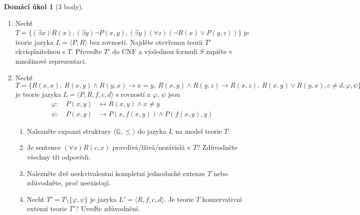 \documentclass[a4paper]{article}
\theoremstyle{definition}
\newtheorem*{ukol}{Domácí úkol}
\begin{document}
\medskip\begin{ukol}[3 body] {\,}
\begin{enumerate}[label=\arabic*.]
\item Nechť $T=\{(\exists x)R(x), (\exists y)\neg P(x,y), (\exists y)(\forall z)(\neg R(x)\vee P(y,z))\}$ je teorie jazyka $L=\langle P,R\rangle$ bez rovnosti. Najděte otevřenou teorii $T'$ ekvisplnitelnou s $T$. Převeďte $T'$ do CNF a výslednou formuli $S$ zapište v množinové reprezentaci.
\item Nechť $T=\{R(x,x),\ R(x,y) \wedge R(y,x) \to x=y,\ R(x,y) \wedge R(y,z) \to R(x,z),\ R(x,y) \vee R(y,x), c\ne d, \varphi,\psi\}$ je teorie jazyka $L=\langle P,R,f,c,d\rangle$ s rovností
a $\varphi$, $\psi$ jsou
\begin{align*}
    \varphi:\quad P(x,y) &\leftrightarrow R(x,y) \wedge x\ne y\\
    \psi:\quad P(x,y) &\to P(x,f(x,y)) \wedge P(f(x,y),y)
\end{align*}
\begin{enumerate}
    \item Nalezněte expanzi struktury $\langle \mathbb{Q},\le \rangle$ do jazyka $L$ na model teorie $T$.
    \item Je sentence $(\forall x)R(c,x)$ pravdivá/lživá/nezávislá v $T$? Zdůvodněte všechny tři odpovědi.
    \item Nalezněte dvě neekvivalentní kompletní jednoduché extenze $T$ nebo zdůvodněte, proč neexistují.
    \item Nechť $T'=T\setminus\{\varphi,\psi\}$ je jazyka $L'=\langle R,f,c,d\rangle$. Je teorie $T$ konzervativní extenzí teorie $T'$? Uveďte zdůvodnění.
\end{enumerate}
\end{enumerate}

\end{ukol}
\end{document}
